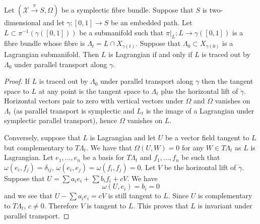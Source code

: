 \documentclass{article}
\begin{document}
\begin{Lemma}[lmafibred]
Let $\left(\mathcal{X}\stackrel{\pi}{\to} S,\Omega\right)$ be a symplectic fibre bundle. Suppose that $S$ is two-dimensional and let $\gamma\colon[0,1]\to S$ be an embedded path. Let $L\subset\pi^{-1}(\gamma([0,1]))$ be a submanifold such that $\pi|_L\colon L\to\gamma([0,1])$ is a fibre bundle whose fibre is $\Lambda_t=L\cap X_{\gamma(t)}$. Suppose that $\Lambda_0\subset X_{\gamma(0)}$ is a Lagrangian submanifold. Then $L$ is Lagrangian if and only if $L$ is traced out by $\Lambda_0$ under parallel transport along $\gamma$.
\end{Lemma}
\begin{proof}
If $L$ is traced out by $\Lambda_0$ under parallel transport along $\gamma$ then the tangent space to $L$ at any point is the tangent space to $\Lambda_t$ plus the horizontal lift of $\dot{\gamma}$. Horizontal vectors pair to zero with vertical vectors under $\Omega$ and $\Omega$ vanishes on $\Lambda_t$ (as parallel transport is symplectic and $L_t$ is the image of a Lagrangian under symplectic parallel transport), hence $\Omega$ vanishes on $L$.

Conversely, suppose that $L$ is Lagrangian and let $U$ be a vector field tangent to $L$ but complementary to $T\Lambda_t$. We have that $\Omega(U,W)=0$ for any $W\in T\Lambda_t$ as $L$ is Lagrangian. Let $e_1,\ldots,e_n$ be a basis for $T\Lambda_t$ and $f_1,\ldots,f_n$ be such that $\omega(e_i,f_j)=\delta_{ij}$, $\omega(e_i,e_j)=\omega(f_i,f_j)=0$. Let $V$ be the horizontal lift of $\dot{\gamma}$. Suppose that $U=\sum a_ie_i+\sum b_if_i+cV$. We have
\[\omega(U,e_i)=b_i=0\]
and we see that $U-\sum a_ie_i=cV$ is still tangent to $L$. Since $U$ is complementary to $T\Lambda_t$, $c\neq 0$. Therefore $V$ is tangent to $L$. This proves that $L$ is invariant under parallel transport.
\end{proof}
\end{document}
